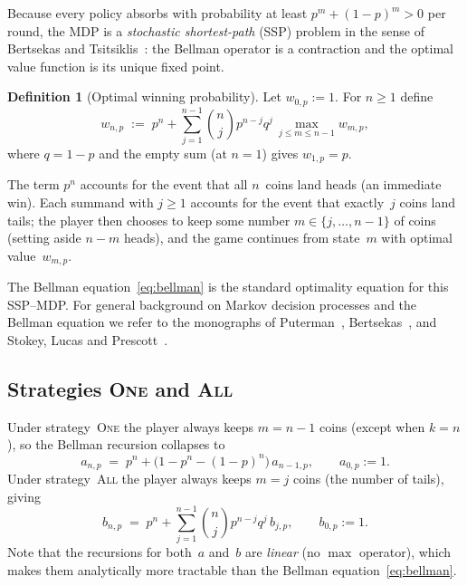 \documentclass[reqno,final,11pt]{amsart}
\theoremstyle{plain}
\theoremstyle{definition}
\newtheorem{definition}[theorem]{Definition}
\theoremstyle{remark}
\newcommand{\One}{\textsc{One}}
\newcommand{\All}{\textsc{All}}
\begin{document}
Because every policy absorbs with probability at least
$p^m+(1-p)^m>0$ per round, the MDP is a \emph{stochastic
shortest-path} (SSP) problem in the sense of Bertsekas and
Tsitsiklis~\citeyearpar{BertsekisTsitsiklis1991}: the Bellman operator is a contraction
and the optimal value function is its unique fixed point.

\begin{definition}[Optimal winning probability]\label{def:w}
  Let $w_{0,p}:=1$.  For $n\ge 1$ define
  \begin{equation}\label{eq:bellman}
    w_{n,p} \;:=\; p^n + \sum_{j=1}^{n-1}\binom{n}{j}p^{n-j}q^{j}\,
    \max_{j\le m\le n-1} w_{m,p},
  \end{equation}
  where $q=1-p$ and the empty sum (at $n=1$) gives
  $w_{1,p}=p$.
\end{definition}

The term $p^n$ accounts for the event that all $n$~coins land heads
(an immediate win).  Each summand with $j\ge 1$ accounts for the
event that exactly~$j$ coins land tails; the player then chooses to
keep some number $m\in\{j,\dots,n-1\}$ of coins (setting aside
$n-m$ heads), and the game continues from state~$m$ with optimal
value~$w_{m,p}$.

The Bellman equation~\eqref{eq:bellman} is the standard optimality
equation for this SSP--MDP.  For general background on Markov decision
processes and the Bellman equation we refer to the monographs of
Puterman~\citeyearpar{Puterman1994}, Bertsekas~\citeyearpar{Bertsekas2017}, and
Stokey, Lucas and Prescott~\citeyearpar{StokeyLucas1989}.

\subsection{Strategies \One{} and \All}

Under strategy~\One{} the player always keeps $m=n-1$ coins
(except when $k=n$), so the Bellman recursion collapses to
\begin{equation}\label{eq:a-rec}
  a_{n,p} \;=\; p^n + \bigl(1-p^n-(1-p)^n\bigr)\,a_{n-1,p},
  \qquad a_{0,p}:=1.
\end{equation}
Under strategy~\All{} the player always keeps $m=j$ coins (the
number of tails), giving
\begin{equation}\label{eq:b-rec}
  b_{n,p} \;=\; p^n + \sum_{j=1}^{n-1}\binom{n}{j}p^{n-j}q^{j}\,
  b_{j,p},
  \qquad b_{0,p}:=1.
\end{equation}
Note that the recursions for both~$a$ and~$b$ are \emph{linear}
(no $\max$ operator), which makes them analytically more tractable
than the Bellman equation~\eqref{eq:bellman}.
\end{document}

